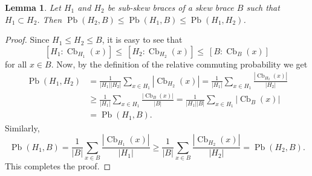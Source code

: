 \documentclass[11pt, oneside]{amsart}
\numberwithin{equation}{section}
\theoremstyle{plain}
\newtheorem{lem}[equation]{Lemma}
\theoremstyle{definition}
\newcommand{\Cb}{\operatorname{Cb} }
\newcommand{\Pb}{\operatorname{Pb} }
\begin{document}
\begin{lem}
      Let $H_1$ and $H_2$ be  sub-skew braces of a skew brace $B$ such that $H_1\subset H_2$. Then 
      $\Pb(H_2,B)\leqslant \Pb(H_1,B)\leqslant \Pb(H_1,H_2)$.
\end{lem}
\begin{proof}
      Since $H_1\leqslant H_2\leqslant B$, it is easy to see that
      $$[H_1:\Cb_{H_1}(x)]\leqslant~[H_2:\Cb_{H_2}(x)]\leqslant~[B:\Cb_{B}(x)]$$
      for all $x\in B$. Now, by the definition of the relative commuting probability we get
      \begin{align*}
            \Pb(H_1,H_2)&=\frac{1}{|H_1||H_2|}\sum_{x\in H_1}|\Cb_{H_2}(x)| =\frac{1}{|H_1|}\sum_{x\in H_1}\frac{|\Cb_{H_2}(x)|}{|H_2|}\\
                     &\geqslant \frac{1}{|H_1|}\sum_{x\in H_1}\frac{|\Cb_{B}(x)|}{|B|} =\frac{1}{|H_1||B|}\sum_{x\in H_1}|\Cb_{B}(x)|\\
                     &=\Pb(H_1,B).
      \end{align*}
      Similarly,
      $$\Pb(H_1,B)  =  \frac{1}{|B|}\sum_{x\in B}\frac{|\Cb_{H_1}(x)|}{|H_1|} \geqslant \frac{1}{|B|}\sum_{x\in B}\frac{|\Cb_{H_2}(x)|}{|H_2|} = \Pb(H_2,B).$$
      This completes the proof.
\end{proof}
\end{document}
